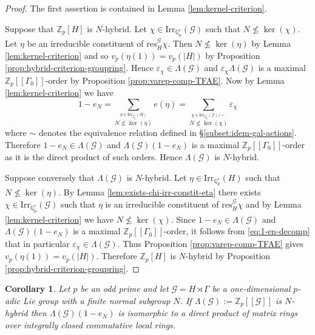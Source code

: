 \documentclass[12pt]{amsart}
\theoremstyle{plain}
\newtheorem{corollary}[theorem]{Corollary}
\theoremstyle{remark}
\theoremstyle{definition}
\numberwithin{equation}{section}
\begin{document}
\begin{proof}
The first assertion is contained in Lemma \ref{lem:kernel-criterion}.

Suppose that ${\mathbb{Z}}_{p}[H]$ is $N$-hybrid.
Let $\chi \in {\mathrm{Irr}}_{{\mathbb{Q}}_{p}^{c}}(\mathcal{G})$ such that $N \not \leq \ker(\chi)$.
Let $\eta$ be an irreducible constituent of ${\mathrm{res}}^{\mathcal{G}}_{H} \chi$.
Then $N \not \leq \ker(\eta)$ by Lemma \ref{lem:kernel-criterion} and so
$v_{p}(\eta(1))=v_{p}(|H|)$ by Proposition \ref{prop:hybrid-criterion-groupring}.
Hence $\varepsilon_{\chi} \in \Lambda(\mathcal{G})$ and $\varepsilon_{\chi}\Lambda(\mathcal{G})$
is a maximal ${\mathbb{Z}}_{p}[[\Gamma_{0}]]$-order by Proposition \ref{prop:varep-comp-TFAE}.
Now by Lemma \ref{lem:kernel-criterion} we have
\begin{equation}\label{eq:1-en-decomp}
 1-e_{N}
= \sum_{\stackrel{\eta \in {\mathrm{Irr}}_{{\mathbb{Q}}_{p}^{c}}(H)}{N \not \leq \ker(\eta)}} e(\eta)
= \sum_{\stackrel{\chi \in {\mathrm{Irr}}_{{\mathbb{Q}}_{p}^{c}}(\mathcal{G})/\sim}{N \not \leq \ker(\chi)}} \varepsilon_{\chi}
\end{equation}
where $\sim$ denotes the equivalence relation defined in \S \ref{subset:idem-gal-actions}.
Therefore $1-e_{N} \in \Lambda(\mathcal{G})$ and
 $\Lambda(\mathcal{G})(1-e_{N})$ is a maximal ${\mathbb{Z}}_{p}[[\Gamma_{0}]]$-order
as it is the direct product of such orders. Hence $\Lambda(\mathcal{G})$ is $N$-hybrid.

Suppose conversely that $\Lambda(\mathcal{G})$ is $N$-hybrid.
Let $\eta \in {\mathrm{Irr}}_{{\mathbb{Q}}_{p}^{c}}(H)$ such that $N \not \leq \ker(\eta)$.
By Lemma \ref{lem:exists-chi-irr-constit-eta} there exists $\chi \in {\mathrm{Irr}}_{{\mathbb{Q}}_{p}^{c}}(\mathcal{G})$ such that $\eta$ is an irreducible
constituent of ${\mathrm{res}}^{\mathcal{G}}_{H} \chi$ and by Lemma \ref{lem:kernel-criterion}
we have $N \not \leq \ker(\chi)$.
Since $1-e_{N} \in \Lambda(\mathcal{G})$ and $\Lambda(\mathcal{G})(1-e_{N})$
is a maximal ${\mathbb{Z}}_{p}[[\Gamma_{0}]]$-order, it follows from
\eqref{eq:1-en-decomp} that in particular $\varepsilon_{\chi} \in \Lambda(\mathcal{G})$.
Thus Proposition \ref{prop:varep-comp-TFAE} gives $v_{p}(\eta(1))=v_{p}(|H|)$.
Therefore ${\mathbb{Z}}_{p}[H]$ is $N$-hybrid by Proposition \ref{prop:hybrid-criterion-groupring}.
\end{proof}

\begin{corollary}\label{cor:hybrid-implies-nr-surjective}
Let $p$ be an odd prime and let $\mathcal{G} = H \rtimes \Gamma$ be a one-dimensional $p$-adic Lie group
with a finite normal subgroup $N$.
If $\Lambda(\mathcal{G}) := {\mathbb{Z}}_{p}[[\mathcal{G}]]$ is $N$-hybrid then
$\Lambda(\mathcal{G})(1-e_{N})$ is isomorphic to a direct product of matrix rings over integrally closed commutative local rings.
\end{corollary}
\end{document}
